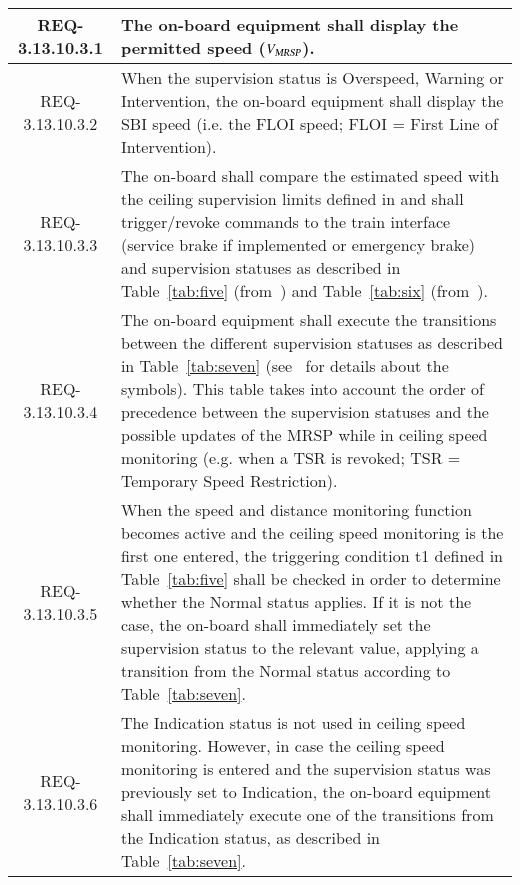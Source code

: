 \begin{table}[htdp]
\begin{center}
\begin{tabular}{|c|p{130mm}|}
\\\hline
REQ-3.13.10.3.1&
The on-board equipment shall display the permitted speed (${V_{\text{\sl MRSP}}}$).
\\\hline
REQ-3.13.10.3.2 &
When the supervision status is Overspeed, Warning or Intervention, the on-board equipment shall display the SBI speed (i.e. the FLOI speed; FLOI = First Line of Intervention).
\\\hline
REQ-3.13.10.3.3&
The on-board shall compare the estimated speed with the ceiling supervision limits defined in \cite[3.13.9.2]{ETCSSRS-Principles} and shall trigger/revoke commands to the train interface (service brake if implemented or emergency brake) and supervision statuses as described in Table~\ref{tab:five} (from~\cite[Table~5]{ETCSSRS-Principles}) and Table~\ref{tab:six} (from~\cite[Table~6]{ETCSSRS-Principles}).
\\\hline
REQ-3.13.10.3.4&
The on-board equipment shall execute the transitions between the different supervision statuses as described in Table~\ref{tab:seven} (see~\cite[4.6.1]{ETCSSRS-Principles} for details about the symbols). This table takes into account the order of precedence between the supervision statuses and the possible updates of the MRSP while in ceiling speed monitoring (e.g. when a TSR is revoked; TSR = Temporary Speed Restriction).
\\\hline
REQ-3.13.10.3.5&
When the speed and distance monitoring function becomes active and the ceiling speed monitoring is the first one entered, the triggering condition t1 defined in Table~\ref{tab:five} shall be checked in order to determine whether the Normal status applies. If it is not the case, the on-board shall immediately set the supervision status to the relevant value, applying a transition from the Normal status according to Table~\ref{tab:seven}.
\\\hline
REQ-3.13.10.3.6&
The Indication status is not used in ceiling speed monitoring. However, in case the ceiling speed monitoring is entered and the supervision status was previously set to Indication, the on-board equipment shall immediately execute one of the transitions from the Indication status, as described in Table~\ref{tab:seven}.

\end{tabular}
\end{center}
\end{table}

